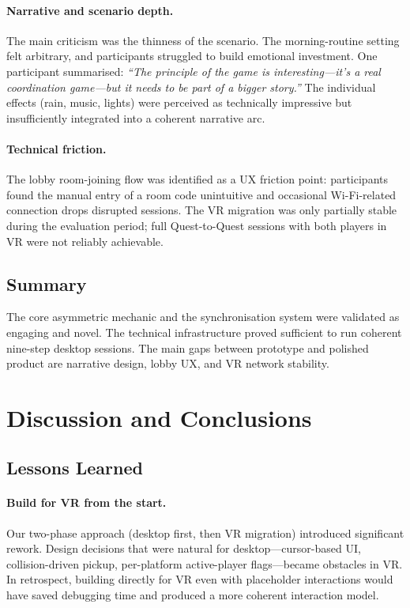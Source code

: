 \documentclass[12pt,a4paper]{article}
\begin{document}
\paragraph{Narrative and scenario depth.}
The main criticism was the thinness of the scenario. The morning-routine setting felt arbitrary, and participants struggled to build emotional investment. One participant summarised: \textit{``The principle of the game is interesting---it's a real coordination game---but it needs to be part of a bigger story.''} The individual effects (rain, music, lights) were perceived as technically impressive but insufficiently integrated into a coherent narrative arc.

\paragraph{Technical friction.}
The lobby room-joining flow was identified as a UX friction point: participants found the manual entry of a room code unintuitive and occasional Wi-Fi-related connection drops disrupted sessions. The VR migration was only partially stable during the evaluation period; full Quest-to-Quest sessions with both players in VR were not reliably achievable.

\subsection{Summary}
The core asymmetric mechanic and the synchronisation system were validated as engaging and novel. The technical infrastructure proved sufficient to run coherent nine-step desktop sessions. The main gaps between prototype and polished product are narrative design, lobby UX, and VR network stability.

\section{Discussion and Conclusions}
\label{sec:discussion}

\subsection{Lessons Learned}

\paragraph{Build for VR from the start.}
Our two-phase approach (desktop first, then VR migration) introduced significant rework. Design decisions that were natural for desktop---cursor-based UI, collision-driven pickup, per-platform active-player flags---became obstacles in VR. In retrospect, building directly for VR even with placeholder interactions would have saved debugging time and produced a more coherent interaction model.
\end{document}
